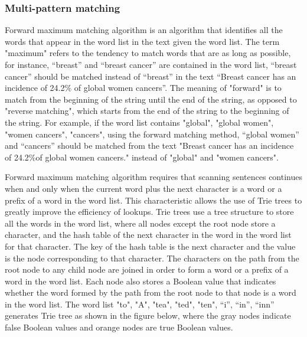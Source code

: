 \subsubsection{Multi-pattern matching}
Forward maximum matching algorithm is an algorithm that identifies all the words that appear in the word list in the text given the word list. The term "maximum" refers to the tendency to match words that are as long as possible, for instance, “breast” and “breast cancer” are contained in the word list, “breast cancer” should be matched instead of “breast” in the text “Breast cancer has an incidence of 24.2$\%$ of global women cancers”. The meaning of "forward" is to match from the beginning of the string until the end of the string, as opposed to "reverse matching", which starts from the end of the string to the beginning of the string. For example, if the word list contains "global", "global women", "women cancers", "cancers", using the forward matching method, “global women” and “cancers” should be matched from the text "Breast cancer has an incidence of 24.2$\%$of global women cancers." instead of "global" and "women cancers". \par
Forward maximum matching algorithm requires that scanning sentences continues when and only when the current word plus the next character is a word or a prefix of a word in the word list. This characteristic allows the use of Trie trees to greatly improve the efficiency of lookups. Trie trees use a tree structure to store all the words in the word list, where all nodes except the root node store a character, and the hash table of the next character in the word in the word list for that character. The key of the hash table is the next character and the value is the node corresponding to that character. The characters on the path from the root node to any child node are joined in order to form a word or a prefix of a word in the word list. Each node also stores a Boolean value that indicates whether the word formed by the path from the root node to that node is a word in the word list. The word list {"to", "A", "tea", "ted", "ten", “i”, “in”, “inn”} generates Trie tree as shown in the figure below, where the gray nodes indicate false Boolean values and orange nodes are true Boolean values. \par
